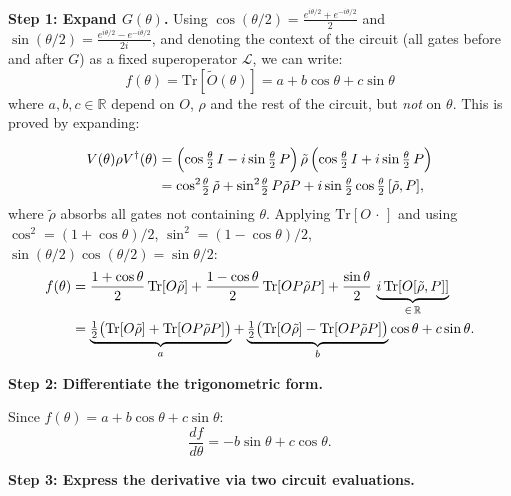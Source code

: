 \documentclass[a4paper,11pt]{article}
\begin{document}
\begin{mathbox}
\textbf{Step 1: Expand $G(\theta)$.}
Using $\cos(\theta/2) = \frac{e^{i\theta/2} + e^{-i\theta/2}}{2}$ and
$\sin(\theta/2) = \frac{e^{i\theta/2} - e^{-i\theta/2}}{2i}$, and
denoting the context of the circuit (all gates before and after $G$)
as a fixed superoperator $\mathcal{L}$, we can write:
\begin{equation}
    f(\theta) = \mathrm{Tr}\!\left[\tilde{O}(\theta)\right]
    = a + b\cos\theta + c\sin\theta
\end{equation}
where $a, b, c \in \mathbb{R}$ depend on $O$, $\rho$ and the rest of
the circuit, but \emph{not} on $\theta$. This is proved by expanding:

\begin{align}
V(\theta)\rho V^\dagger(\theta) &=
    \Bigl(\cos\tfrac{\theta}{2}\,I - i\sin\tfrac{\theta}{2}\,P\Bigr)\,
    \tilde{\rho}\,
    \Bigl(\cos\tfrac{\theta}{2}\,I + i\sin\tfrac{\theta}{2}\,P\Bigr) \notag\\
&= \cos^2\!\tfrac{\theta}{2}\,\tilde{\rho}
   + \sin^2\!\tfrac{\theta}{2}\,P\tilde{\rho}P
   + i\sin\tfrac{\theta}{2}\cos\tfrac{\theta}{2}\,[\tilde{\rho},P], \notag
\end{align}
where $\tilde\rho$ absorbs all gates not containing $\theta$. Applying
$\mathrm{Tr}[O\,\cdot\,]$ and using $\cos^2 = (1+\cos\theta)/2$,
$\sin^2 = (1-\cos\theta)/2$, $\sin(\theta/2)\cos(\theta/2) = \sin\theta/2$:
\begin{align}
f(\theta) &= \frac{1+\cos\theta}{2}\,\mathrm{Tr}[O\tilde\rho]
    + \frac{1-\cos\theta}{2}\,\mathrm{Tr}[OP\tilde\rho P]
    + \frac{\sin\theta}{2}\,\underbrace{i\,\mathrm{Tr}[O[\tilde\rho,P]]}_{\in\,\mathbb{R}} \notag\\
&= \underbrace{\tfrac{1}{2}\bigl(\mathrm{Tr}[O\tilde\rho]+\mathrm{Tr}[OP\tilde\rho P]\bigr)}_{a}
   + \underbrace{\tfrac{1}{2}\bigl(\mathrm{Tr}[O\tilde\rho]-\mathrm{Tr}[OP\tilde\rho P]\bigr)}_{b}\cos\theta
   + c\sin\theta. \notag
\end{align}

\textbf{Step 2: Differentiate the trigonometric form.}

Since $f(\theta) = a + b\cos\theta + c\sin\theta$:
\begin{equation}
    \frac{df}{d\theta} = -b\sin\theta + c\cos\theta.
\end{equation}

\textbf{Step 3: Express the derivative via two circuit evaluations.}


\end{mathbox}
\end{document}
